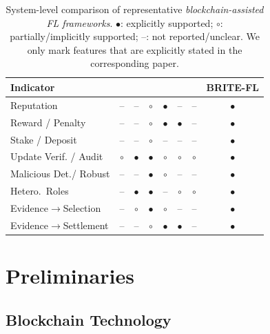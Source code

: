 \documentclass[a4paper]{cas-dc}
\begin{document}
\begin{table}[t]
	\caption{System-level comparison of representative \emph{blockchain-assisted FL frameworks}.
		$\bullet$: explicitly supported; $\circ$: partially/implicitly supported; --: not reported/unclear.
		We only mark features that are explicitly stated in the corresponding paper.}
	\label{tab:comparison}
	\centering
	\small
	\renewcommand{\arraystretch}{1.15}
	\begin{tabular*}{\textwidth}{@{\extracolsep{\fill}}lccccccc@{}}
		\toprule
		\textbf{Indicator} &
		\cite{28} &
		\cite{4} &
		\cite{66} &
		\cite{7} &
		\cite{27} &
		\cite{36} &
		\textbf{BRITE-FL} \\
		\midrule
		Reputation              & --        & --        & $\circ$   & $\bullet$ & --        & --        & $\bullet$ \\
		Reward / Penalty        & --        & --        & $\circ$   & $\bullet$ & $\bullet$ & --        & $\bullet$ \\
		Stake / Deposit         & --        & --        & $\circ$   & --        & --        & --        & $\bullet$ \\
		Update Verif. / Audit   & $\circ$   & $\bullet$ & $\bullet$ & $\circ$   & $\circ$   & $\circ$   & $\bullet$ \\
		Malicious Det./ Robust  & --        & --        & $\bullet$ & $\circ$   & --        & --        & $\bullet$ \\
		Hetero.\ Roles          & --        & $\bullet$ & $\bullet$ & --        & $\circ$   & $\circ$   & $\bullet$ \\
		Evidence$\to$Selection  & --        & $\circ$   & $\bullet$ & $\circ$   & --        & --        & $\bullet$ \\
		Evidence$\to$Settlement & --        & --        & $\circ$   & $\bullet$ & $\bullet$ & --        & $\bullet$ \\
		\bottomrule
	\end{tabular*}
\end{table}

\section{Preliminaries}\label{sec:3}
\subsection{Blockchain Technology}
\end{document}
